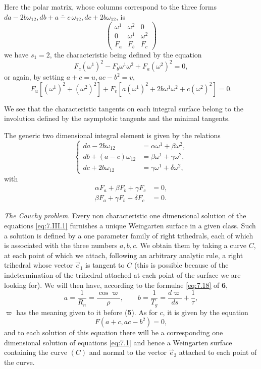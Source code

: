 \documentclass[leqno,11pt]{book}
\numberwithin{equation}{chapter}
\theoremstyle{shape1}
\theoremstyle{shape0}
\theoremstyle{shape2}
\theoremstyle{definition}
\begin{document}
Here  the polar matrix, whose columns correspond to the three forms $da-2b\omega_{12},db+\overline{a-c}\,\omega_{12},dc+2b\omega_{12}$, is
\[
\begin{pmatrix}
  \omega^{1}&\omega^{2}&0\\
  0&\omega^{1}&\omega^{2}\\
  F_{a}&F_{b}&F_{c}
\end{pmatrix}
\]
we have $s_{1}=2$, the characteristic being defined by the equation
\[
F_{c}(\omega^{1})^{2}-F_{b}\omega^{1}\omega^{2}+F_{a}(\omega^{2})^{2}=0,
\]
or again, by setting $a+c=u, ac-b^{2}=v$,
\begin{equation}
  \label{eq:7.III.4}
  \tag{III, 4}
  F_{u}[(\omega^{1})^{2}+(\omega^{2})^{2}]+F_{v}[a(\omega^{1})^{2}+2b\omega^{1}\omega^{2}+c(\omega^{2})^{2}]=0.
\end{equation}

We see that the characteristic tangents on each integral surface belong to the involution defined by the asymptotic tangents and the minimal tangents.

The generic two dimensional integral element is given by the relations
\begin{equation}
  \label{eq:7.III.5}\tag{III, 5}
  \left\{
    \begin{aligned}
      da-2b\omega_{12}&=\alpha\omega^{1}+\beta\omega^{2},\\
      db+(a-c)\omega_{12}&=\beta\omega^{1}+\gamma\omega^{2},\\
      dc+2b\omega_{12}&=\gamma\omega^{1}+\delta\omega^{2},
    \end{aligned}
  \right.
\end{equation}
with
\begin{align*}
  \alpha F_{a}+\beta F_{b}+\gamma F_{c}&=0,\\
  \beta F_{a}+\gamma F_{b}+\delta F_{c}&=0.
\end{align*}



\vspace{12pt}\fsec\emph{The Cauchy problem}. Every non characteristic one dimensional solution of the equations \eqref{eq:7.III.1} furnishes a unique Weingarten surface in a given class. Such a solution is defined by a one parameter family of right trihedrals, each of which is associated with the three numbers $a, b, c$. We obtain them by taking a curve $C$, at each point of which we attach, following an arbitrary analytic rule, a right trihedral whose vector $\vec e_{1}$ is tangent to $C$ (this is possible because of the indetermination of the trihedral attached at each  point of the surface we are looking for). We will then have, according to the formulae \eqref{eq:7.18} of \textsection\textbf{6},
\[
a=\frac{1}{R_{n}}=\frac{\cos\varpi}{\rho},\qquad b=\frac{1}{T_{g}}=\frac{d\varpi}{ds}+\frac{1}{\tau},
\]
$\varpi$ has the meaning given to it before (\textsection\textbf{5}). As for $c$, it is given by the equation
\[
F(a+c,ac-b^{2})=0,
\]
and to each solution of this equation there will be a corresponding one dimensional solution of equations \eqref{eq:7.1} and hence a Weingarten surface containing the curve $(C)$ and normal to the vector $\vec e_{3}$ attached to each point of the curve.
\end{document}
